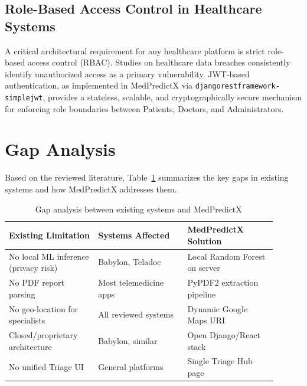 \subsection{Role-Based Access Control in Healthcare Systems}
A critical architectural requirement for any healthcare platform is strict role-based access control (RBAC). Studies on healthcare data breaches consistently identify unauthorized access as a primary vulnerability. JWT-based authentication, as implemented in MedPredictX via \texttt{djangorestframework-simplejwt}, provides a stateless, scalable, and cryptographically secure mechanism for enforcing role boundaries between Patients, Doctors, and Administrators.

\section{Gap Analysis}

Based on the reviewed literature, Table~\ref{tab:gap} summarizes the key gaps in existing systems and how MedPredictX addresses them.

\begin{table}[htbp]
\centering
\caption{Gap analysis between existing systems and MedPredictX}
\label{tab:gap}
\begin{tabular}{|p{0.3\linewidth}|p{0.3\linewidth}|p{0.3\linewidth}|}
\hline
\textbf{Existing Limitation} & \textbf{Systems Affected} & \textbf{MedPredictX Solution} \\
\hline
No local ML inference (privacy risk) & Babylon, Teladoc & Local Random Forest on server \\
\hline
No PDF report parsing & Most telemedicine apps & PyPDF2 extraction pipeline \\
\hline
No geo-location for specialists & All reviewed systems & Dynamic Google Maps URI \\
\hline
Closed/proprietary architecture & Babylon, similar & Open Django/React stack \\
\hline
No unified Triage UI & General platforms & Single Triage Hub page \\
\hline
\end{tabular}
\end{table}
